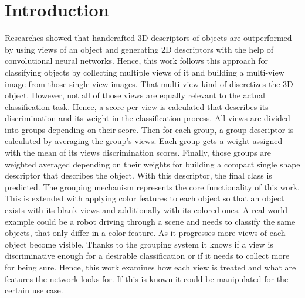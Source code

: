 \chapter{Introduction}
\label{sec:introduction}
%
%
Researches showed that handcrafted 3D descriptors of objects are outperformed by using views of an object and generating 2D descriptors with the help of convolutional neural networks.
Hence, this work follows this approach for classifying objects by collecting multiple views of it and building a multi-view image from those single view images.
That multi-view kind of discretizes the 3D object. 
However, not all of those views are equally relevant to the actual classification task.
Hence, a score per view is calculated that describes its discrimination and its weight in the classification process.
All views are divided into groups depending on their score.
Then for each group, a group descriptor is calculated by averaging the group's views.
Each group gets a weight assigned with the mean of its views discrimination scores.
Finally, those groups are weighted averaged depending on their weights for building a compact single shape descriptor that describes the object.
With this descriptor, the final class is predicted.
The grouping mechanism represents the core functionality of this work.
This is extended with applying color features to each object so that an object exists with its blank views and additionally with its colored ones.
A real-world example could be a robot driving through a scene and needs to classify the same objects, that only differ in a color feature.
As it progresses more views of each object become visible.
Thanks to the grouping system it knows if a view is discriminative enough for a desirable classification or if it needs to collect more for being sure.
Hence, this work examines how each view is treated and what are features the network looks for.
If this is known it could be manipulated for the certain use case.

